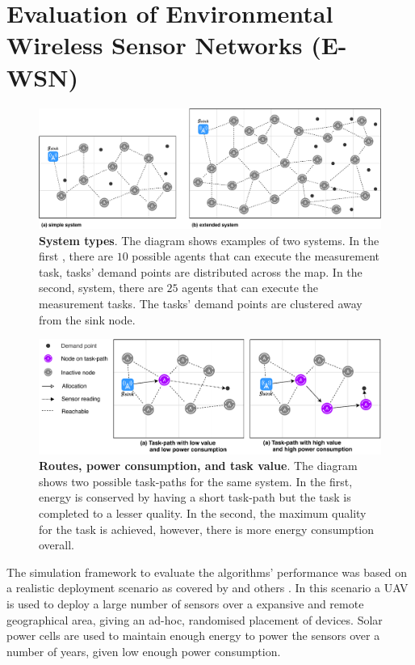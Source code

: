 \section{Evaluation of Environmental Wireless Sensor Networks (E-WSN)}
\label{section:experimental}	
\begin{figure}[ht]
	\centering
	\includegraphics[width=0.9\linewidth, trim={25pt 0pt 25pt 0pt, clip}]{system-types}
	\caption{\textbf{System types}. The diagram shows examples of two systems. In the first \simulationSimple{}{}, there are $10$ possible agents that can execute the measurement task, tasks' demand points are distributed across the map. In the second, \simulationExtended{}{} system, there are $25$ agents that can execute the measurement tasks. The tasks' demand points are clustered away from the sink node.}
	\label{fig:system-types}
\end{figure}
\begin{figure}[ht]
	\centering
	\includegraphics[width=0.9\linewidth, trim={25pt 0pt 25pt 0pt, clip}]{route-types}
	\caption{\textbf{Routes, power consumption, and task value}. The diagram shows two possible task-paths for the same system. In the first, energy is conserved by having a short task-path but the task is completed to a lesser quality. In the second, the maximum quality for the task is achieved, however, there is more energy consumption overall.}
	\label{fig:route_types}
\end{figure}

The simulation framework to evaluate the algorithms' performance was based on a realistic deployment scenario as covered by  \cite{Gomez2015} and others \citep{Jha2016, Avram}. In this scenario a UAV is used to deploy a large number of sensors over a expansive and remote geographical area, giving an ad-hoc, randomised placement of devices. Solar power cells are used to maintain enough energy to power the sensors over a number of years, given low enough power consumption. 

